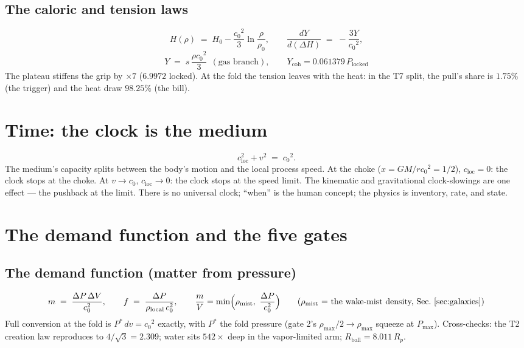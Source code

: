 \documentclass[11pt, a4paper]{article}
\newcommand{\cnot}{\ensuremath{c_0}}
\newcommand{\rhonot}{\ensuremath{\rho_0}}
\newcommand{\rhomax}{\ensuremath{\rho_{\mathrm{max}}}}
\newcommand{\Hnot}{\ensuremath{H_0}}
\newcommand{\snot}{\ensuremath{s}}
\begin{document}
\subsection{The caloric and tension laws}
\begin{equation}
H(\rho) \;=\; \Hnot - \frac{\cnot^2}{3}\ln\frac{\rho}{\rhonot},
\qquad
\frac{dY}{d(\Delta H)} \;=\; -\frac{3Y}{\cnot^2},
\end{equation}
\begin{equation}
Y \;=\; \snot\,\frac{\rho\cnot^2}{3}\ \ (\text{gas branch}),
\qquad
Y_{\mathrm{coh}} = 0.061379\,P_{\mathrm{locked}}
\end{equation}
The plateau stiffens the grip by $\times7$ ($6.9972$ locked). At the fold the
tension leaves with the heat: in the T7 split, the pull's share is $1.75\%$
(the trigger) and the heat draw $98.25\%$ (the bill).

\section{Time: the clock is the medium}
\label{sec:time}
\begin{equation}
c_{\mathrm{loc}}^2 + v^2 \;=\; \cnot^2.
\end{equation}
The medium's capacity splits between the body's motion and the local process
speed. At the choke ($x = GM/r\cnot^2 = 1/2$), $c_{\mathrm{loc}} = 0$: the clock
stops at the choke. At $v\to\cnot$, $c_{\mathrm{loc}}\to0$: the clock stops at
the speed limit. The kinematic and gravitational clock-slowings are one effect ---
the pushback at the limit. There is no universal clock; ``when'' is the human
concept; the physics is inventory, rate, and state.

\section{The demand function and the five gates}
\label{sec:gates}
\subsection{The demand function (matter from pressure)}
\begin{equation}
m \;=\; \frac{\Delta P\,\Delta V}{\cnot^2}, \qquad
f \;=\; \frac{\Delta P}{\rho_{\mathrm{local}}\,\cnot^2},
\qquad
\frac{m}{V} = \min\!\Big(\rho_{\mathrm{mist}},\ \frac{\Delta P}{\cnot^2}\Big)
\qquad (\rho_{\mathrm{mist}} \text{ = the wake-mist density, Sec.~\ref{sec:galaxies}})
\end{equation}
Full conversion at the fold is $P^*\,dv = \cnot^2$ exactly, with $P^*$ the fold
pressure (gate 2's $\rhomax/2\to\rhomax$ squeeze at $P_{\max}$). Cross-checks: the T2
creation law reproduces to $4/\sqrt3 = 2.309$; water sits $542\times$ deep in the
vapor-limited arm; $R_{\mathrm{ball}} = 8.011\,R_p$.
\end{document}
